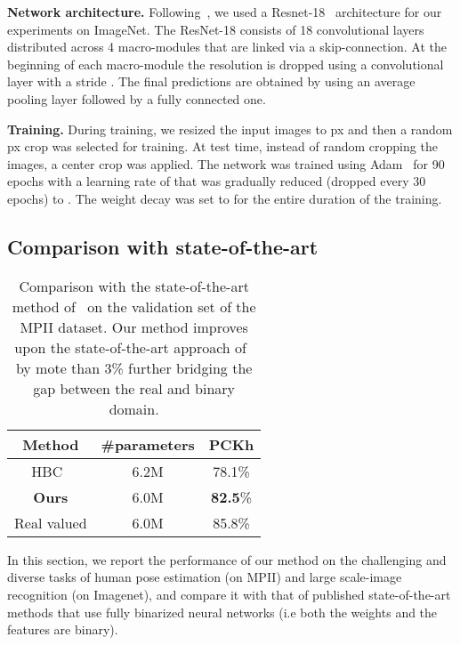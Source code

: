 \documentclass[10pt,twocolumn,letterpaper]{article}
\begin{document}
\noindent\textbf{Network architecture.} Following~\cite{rastegari2016xnor,courbariaux2015binaryconnect}, we used a Resnet-18~\cite{he2016deep} architecture for our experiments on ImageNet. The ResNet-18 consists of 18 convolutional layers distributed across 4 macro-modules that are linked via a skip-connection. At the beginning of each macro-module the resolution is dropped using a convolutional layer with a stride . The final predictions are obtained by using an average pooling layer followed by a fully connected one.

\noindent\textbf{Training.} During training, we resized the input images to px and then a random px crop was selected for training. At test time, instead of random cropping the images, a center crop was applied. The network was trained using Adam~\cite{kingma2014adam} for 90 epochs with a learning rate of  that was gradually reduced (dropped every 30 epochs) to . The weight decay was set to  for the entire duration of the training.

\subsection{Comparison with state-of-the-art}\label{ssec:sota}

\begin{table}[!htbp]
	\begin{center}
    \small{
		\begin{tabular}{|c|c|c|}
			\hline
			Method & \#parameters & PCKh \\
			\hline\hline
			HBC~\cite{bulat2017binarized} & 6.2M  & 78.1\% \\
			\hline
			\textbf{Ours} &  6.0M  & \textbf{82.5}\% \\
			\hline
			Real valued & 6.0M & 85.8\% \\
			\hline
		\end{tabular}
		}
	\end{center}
	\caption{Comparison with the state-of-the-art method of~\cite{bulat2017binarized} on the validation set of the MPII dataset. Our method improves upon the state-of-the-art approach of~\cite{bulat2017binarized} by mote than 3\% further bridging the gap between the real and binary domain.}
	\label{tab:results-sota-mpii}
\end{table}

In this section, we report the performance of our method on the challenging and diverse tasks of human pose estimation (on MPII) and large scale-image recognition (on Imagenet), and compare it with that of published  state-of-the-art methods that use fully binarized neural networks (i.e both the weights and the features are binary). 
\end{document}
